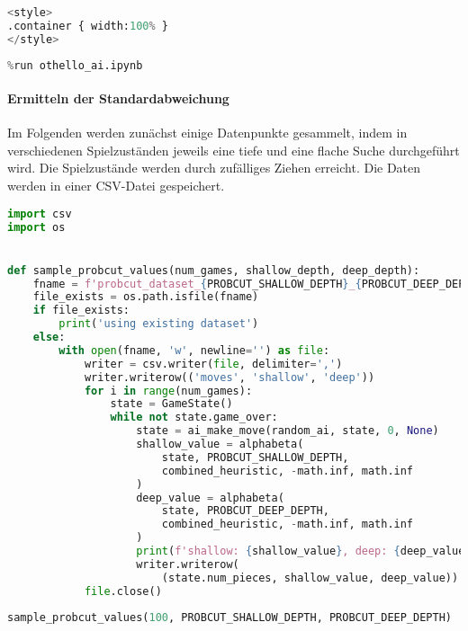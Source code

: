 \begin{lstlisting}[language=Python]
%%HTML
<style>
.container { width:100% }
</style>
\end{lstlisting}

\begin{lstlisting}[language=Python]
%run othello_game.ipynb
%run othello_ai.ipynb
\end{lstlisting}

\hypertarget{ermitteln-der-standardabweichung}{%
\paragraph{Ermitteln der
Standardabweichung}\label{ermitteln-der-standardabweichung}}

Im Folgenden werden zunächst einige Datenpunkte gesammelt, indem in
verschiedenen Spielzuständen jeweils eine tiefe und eine flache Suche
durchgeführt wird. Die Spielzustände werden durch zufälliges Ziehen
erreicht. Die Daten werden in einer CSV-Datei gespeichert.

\begin{lstlisting}[language=Python]
import csv
import os


def sample_probcut_values(num_games, shallow_depth, deep_depth):
    fname = f'probcut_dataset_{PROBCUT_SHALLOW_DEPTH}_{PROBCUT_DEEP_DEPTH}.csv'
    file_exists = os.path.isfile(fname)
    if file_exists:
        print('using existing dataset')
    else:
        with open(fname, 'w', newline='') as file:
            writer = csv.writer(file, delimiter=',')
            writer.writerow(('moves', 'shallow', 'deep'))
            for i in range(num_games):
                state = GameState()
                while not state.game_over:
                    state = ai_make_move(random_ai, state, 0, None)
                    shallow_value = alphabeta(
                        state, PROBCUT_SHALLOW_DEPTH,
                        combined_heuristic, -math.inf, math.inf
                    )
                    deep_value = alphabeta(
                        state, PROBCUT_DEEP_DEPTH,
                        combined_heuristic, -math.inf, math.inf
                    )
                    print(f'shallow: {shallow_value}, deep: {deep_value}')
                    writer.writerow(
                        (state.num_pieces, shallow_value, deep_value))
            file.close()
\end{lstlisting}

\begin{lstlisting}[language=Python]
sample_probcut_values(100, PROBCUT_SHALLOW_DEPTH, PROBCUT_DEEP_DEPTH)
\end{lstlisting}

